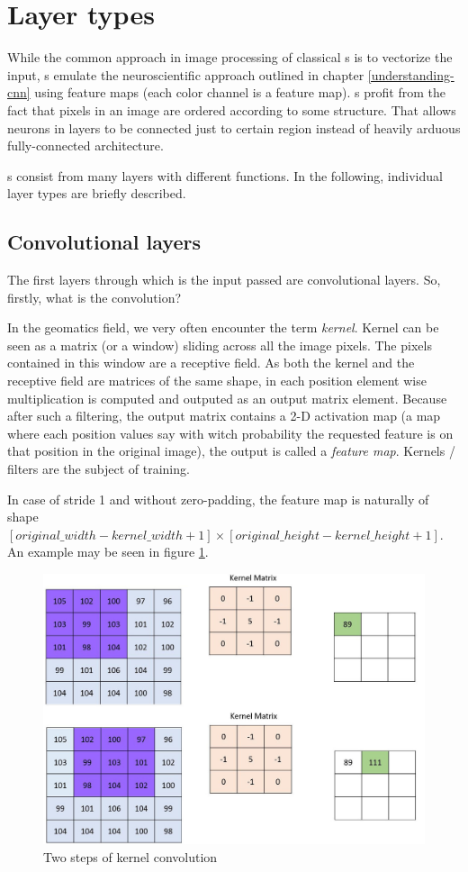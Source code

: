 \section{Layer types}
\label{layers}

While the common approach in image processing of classical s is to vectorize the input, s emulate the neuroscientific approach outlined in chapter \ref{understanding-cnn} using feature maps (each color channel is a feature map). s profit from the fact that pixels in an image are ordered according to some structure. That allows neurons in layers to be connected just to certain region instead of heavily arduous fully-connected architecture. 

s consist from many layers with different functions. In the following, individual layer types are briefly described. 

\subsection{Convolutional layers}
\label{conv-layers}

The first layers through which is the input passed are convolutional layers. So, firstly, what is the convolution? 

In the geomatics field, we very often encounter the term \textit{kernel}. Kernel can be seen as a matrix (or a window) sliding across all the image pixels. The pixels contained in this window are a receptive field. As both the kernel and the receptive field are matrices of the same shape, in each position element wise multiplication is computed and outputed as an output matrix element. Because after such a filtering, the output matrix contains a 2-D activation map (a map where each position values say with witch probability the requested feature is on that position in the original image), the output is called a \textit{feature map}. Kernels / filters are the subject of training. 

In case of stride 1 and without zero-padding, the feature map is naturally of shape $[original\_width - kernel\_width + 1] \times [original\_height - kernel\_height + 1]$. An example may be seen in figure \ref{fig:conv}. 

\begin{figure}[H]
   \centering
	\includegraphics[width=.4\linewidth]{./pictures/conv.jpg}
	\caption[Kernel convolution]{Two steps of kernel convolution}
      \label{fig:conv}
\end{figure}

